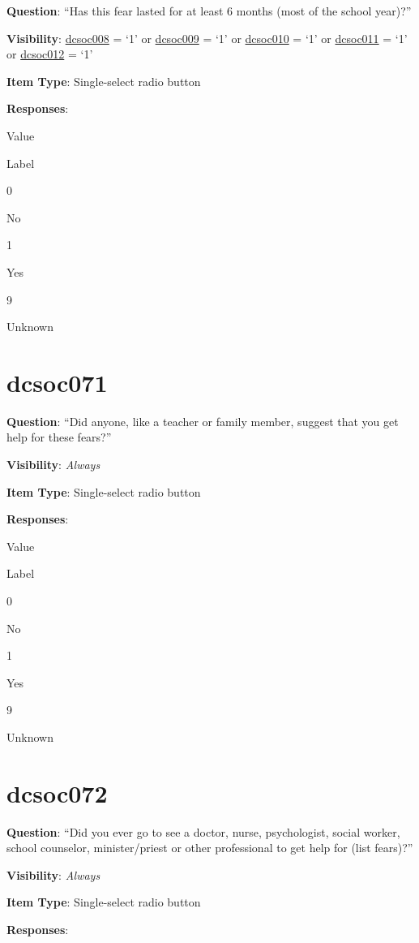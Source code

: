 \documentclass[]{book}
\begin{document}
\textbf{Question}: ``Has this fear lasted for at least 6 months (most of the school year)?''

\textbf{Visibility}: \protect\hyperlink{dcsoc008}{dcsoc008} = `1' or \protect\hyperlink{dcsoc009}{dcsoc009} = `1' or \protect\hyperlink{dcsoc010}{dcsoc010} = `1' or \protect\hyperlink{dcsoc011}{dcsoc011} = `1' or \protect\hyperlink{dcsoc012}{dcsoc012} = `1'

\textbf{Item Type}: Single-select radio button

\textbf{Responses}:

Value

Label

0

No

1

Yes

9

Unknown

\hypertarget{dcsoc071}{%
\section{dcsoc071}\label{dcsoc071}}

\textbf{Question}: ``Did anyone, like a teacher or family member, suggest that you get help for these fears?''

\textbf{Visibility}: \emph{Always}

\textbf{Item Type}: Single-select radio button

\textbf{Responses}:

Value

Label

0

No

1

Yes

9

Unknown

\hypertarget{dcsoc072}{%
\section{dcsoc072}\label{dcsoc072}}

\textbf{Question}: ``Did you ever go to see a doctor, nurse, psychologist, social worker, school counselor, minister/priest or other professional to get help for (list fears)?''

\textbf{Visibility}: \emph{Always}

\textbf{Item Type}: Single-select radio button

\textbf{Responses}:
\end{document}
